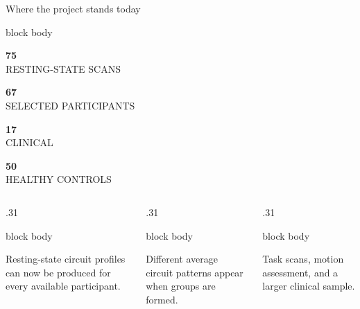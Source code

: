 \documentclass[aspectratio=169,10pt]{beamer}
\newcommand{\kpi}[2]{%
  \begin{minipage}[c][0.82cm][c]{0.22\textwidth}\centering
    {\color{Navy}\fontsize{22}{22}\selectfont\bfseries #1}\\[1pt]
    {\color{Muted}\scriptsize\MakeUppercase{#2}}
  \end{minipage}}
\begin{document}
\begin{frame}{Where the project stands today}
\centering
\begin{beamercolorbox}[rounded=true,sep=.12cm,wd=.96\textwidth]{block body}
  \kpi{75}{resting-state scans}\kpi{67}{selected participants}\kpi{17}{clinical}\kpi{50}{healthy controls}
\end{beamercolorbox}

\vspace{.48cm}
\begin{columns}[T,onlytextwidth]
  \begin{column}{.31\textwidth}
    \begin{beamercolorbox}[rounded=true,sep=.30cm]{block body}
      {\color{Teal}\large\faCheckCircle}\par\vspace{.18cm}
      \small Resting-state circuit profiles can now be produced for every available participant.
    \end{beamercolorbox}
  \end{column}
  \begin{column}{.31\textwidth}
    \begin{beamercolorbox}[rounded=true,sep=.30cm]{block body}
      {\color{Amber}\large\faEye}\par\vspace{.18cm}
      \small Different average circuit patterns appear when groups are formed.
    \end{beamercolorbox}
  \end{column}
  \begin{column}{.31\textwidth}
    \begin{beamercolorbox}[rounded=true,sep=.30cm]{block body}
      {\color{Red}\large\faHourglassHalf}\par\vspace{.18cm}
      \small Task scans, motion assessment, and a larger clinical sample.
    \end{beamercolorbox}
  \end{column}
\end{columns}

\vspace{.48cm}
\end{frame}
\end{document}
